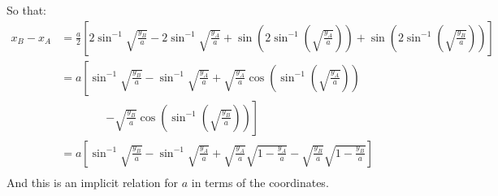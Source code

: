 \documentclass[12pt,a4]{article}
\begin{document}
\begin{enumerate}
\begin{enumerate}
\begin{equation*}
        \end{equation*}
        So that:
        \begin{align*}
          x_B - x_A &= \frac{a}{2} \left[2\sin^{-1}\sqrt{\frac{ y_{B}}{a}} - 2\sin^{-1}\sqrt{\frac{ y_{A}}{a}} + \sin\left(2\sin^{-1}\left(\sqrt{\frac{ y_{A}}{a}}\right)\right) + \sin\left(2\sin^{-1}\left(\sqrt{\frac{ y_{B}}{a}}\right)\right)\right] \\
                    &= a \left[\sin^{-1}\sqrt{\frac{ y_{B}}{a}} - \sin^{-1}\sqrt{\frac{ y_{A}}{a}} + \sqrt{\frac{ y_{A}}{a}}\cos\left(\sin^{-1}\left(\sqrt{\frac{ y_{A}}{a}}\right)\right)\right. \\
                    &\qquad \qquad \left. - \sqrt{\frac{ y_{B}}{a}}\cos\left(\sin^{-1}\left(\sqrt{\frac{ y_{B}}{a}}\right)\right)\right] \\
                    &= a \left[\sin^{-1}\sqrt{\frac{ y_{B}}{a}} - \sin^{-1}\sqrt{\frac{ y_{A}}{a}} + \sqrt{\frac{ y_{A}}{a}}\sqrt{1 - \frac{ y_{A}}{a}} - \sqrt{\frac{ y_{B}}{a}}\sqrt{1 - \frac{ y_{B}}{a}}\right] \\
        \end{align*}
        And this is an implicit relation for $a$ in terms of the coordinates.
        

\end{enumerate}
\end{enumerate}
\end{document}
